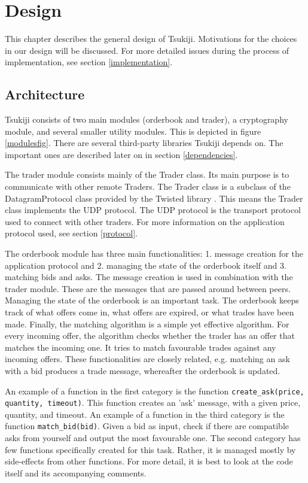 \section{Design}
This chapter describes the general design of Tsukiji.
Motivations for the choices in our design will be discussed.
For more detailed issues during the process of implementation, see section \ref{implementation}.

\subsection{Architecture}
Tsukiji consists of two main modules (orderbook and trader), a cryptography module, and several smaller utility modules.
This is depicted in figure \ref{modulesfig}.
There are several third-party libraries Tsukiji depends on.
The important ones are described later on in section \ref{dependencies}.

The trader module consists mainly of the Trader class.
Its main purpose is to communicate with other remote Traders.
The Trader class is a subclass of the DatagramProtocol class provided by the Twisted library \cite{twisted}.
This means the Trader class implements the UDP protocol.
The UDP protocol is the transport protocol used to connect with other traders.
For more information on the application protocol used, see section \ref{protocol}.

The orderbook module has three main functionalities: 1. message creation for the application protocol and 2. managing the state of the orderbook itself and 3. matching bids and asks.
The message creation is used in combination with the trader module.
These are the messages that are passed around between peers.
Managing the state of the orderbook is an important task.
The orderbook keeps track of what offers come in, what offers are expired, or what trades have been made.
Finally, the matching algorithm is a simple yet effective algorithm.
For every incoming offer, the algorithm checks whether the trader has an offer that matches the incoming one.
It tries to match favourable trades against any incoming offers.
These functionalities are closely related, e.g. matching an ask with a bid produces a trade message, whereafter the orderbook is updated.

An example of a function in the first category is the function \texttt{create\_ask(price, quantity, timeout)}.
This function creates an 'ask' message, with a given price, quantity, and timeout.
An example of a function in the third category is the function \texttt{match\_bid(bid)}.
Given a bid as input, check if there are compatible asks from yourself and output the most favourable one.
The second category has few functions specifically created for this task.
Rather, it is managed mostly by side-effects from other functions.
For more detail, it is best to look at the code itself and its accompanying comments.

